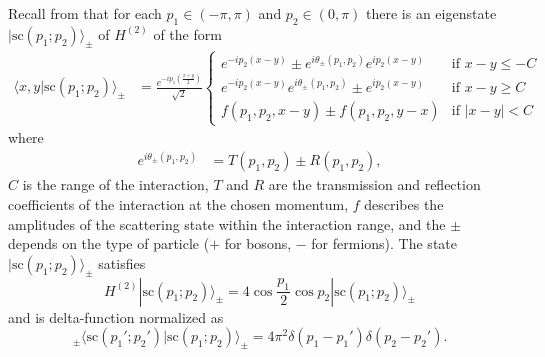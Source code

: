 \documentclass[../thesis-main/thesis-main]{subfiles}
\begin{document}
Recall from  that for each $p_{1}\in(-\pi,\pi)$ and $p_{2}\in(0,\pi)$ there is an eigenstate $|\text{sc}(p_{1};p_{2})\rangle_{\pm}$ of $H^{(2)}$ of the form 
\begin{align}
  \langle x,y|\text{sc}(p_{1};p_{2})\rangle_\pm &=
    \frac{e^{-ip_{1}\left(\frac{x+y}{2}\right)}}{\sqrt{2}} 
    \begin{cases} e^{-i p_2 (x-y)} \pm  e^{i \theta_{\pm}(p_1,p_2)} e^{i p_2 (x - y)} & \text{if } x - y \leq -C\\
     e^{- i p_2 (x-y)}e^{i\theta_{\pm}(p_1,p_2)} \pm e^{i p_2 (x-y)} & \text{if }x-y \geq C\\
    f(p_1,p_2,x-y) \pm f(p_1,p_2,y-x)& \text{if }|x-y|< C \end{cases}\label{eq:sc}
\end{align}
where
\begin{align*}
e^{i \theta_\pm (p_{1},p_{2})} & =  T(p_1,p_2) \pm R(p_1,p_2),
\end{align*}
$C$ is the range of the interaction, $T$ and $R$ are the transmission
and reflection coefficients of the interaction at the chosen momentum, $f$
describes the amplitudes of the scattering state within the interaction range, and the $\pm$ depends
on the type of particle ($+$ for bosons, $-$ for fermions).  The state
$|\text{sc}(p_{1};p_{2})\rangle_\pm$ satisfies 
\[
H^{(2)}|\text{sc}(p_{1};p_{2})\rangle_{\pm} = 4\cos \frac{p_{1}}{2}\cos p_{2} |\text{sc}(p_{1};p_{2})\rangle_\pm
\]
and is delta-function normalized as
\begin{equation}
_{\pm}\langle\text{sc}(p_{1}';p_{2}')|\text{sc}(p_{1};p_{2})\rangle_{\pm}=
  4 \pi^{2} \delta(p_{1} - p_{1}') \delta(p_{2} - p_{2}').
\label{eq:del_func_norm}
\end{equation}
\end{document}
